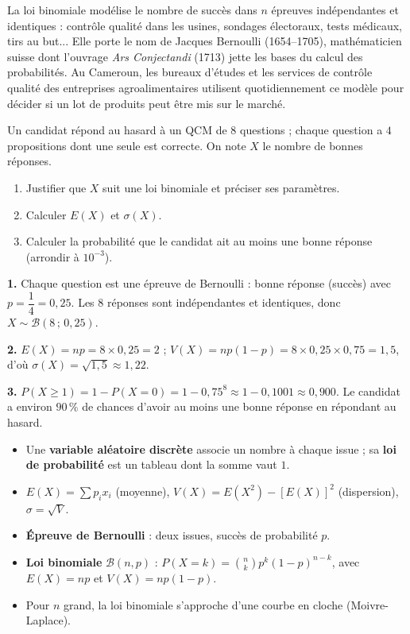 \documentclass[11pt]{article}
\begin{document}
\begin{savaistu}
La loi binomiale modélise le nombre de succès dans $n$ épreuves indépendantes et identiques : contrôle qualité dans les usines, sondages électoraux, tests médicaux, tirs au but... Elle porte le nom de Jacques Bernoulli (1654--1705), mathématicien suisse dont l'ouvrage \emph{Ars Conjectandi} (1713) jette les bases du calcul des probabilités. Au Cameroun, les bureaux d'études et les services de contrôle qualité des entreprises agroalimentaires utilisent quotidiennement ce modèle pour décider si un lot de produits peut être mis sur le marché.
\end{savaistu}

\begin{exercice}
Un candidat répond au hasard à un QCM de $8$ questions ; chaque question a $4$ propositions dont une seule est correcte. On note $X$ le nombre de bonnes réponses.
\begin{enumerate}
\item Justifier que $X$ suit une loi binomiale et préciser ses paramètres.
\item Calculer $E(X)$ et $\sigma(X)$.
\item Calculer la probabilité que le candidat ait au moins une bonne réponse (arrondir à $10^{-3}$).
\end{enumerate}
\end{exercice}

\begin{corrige}[Exercice 3.5]
\textbf{1.} Chaque question est une épreuve de Bernoulli : bonne réponse (succès) avec $p = \dfrac{1}{4} = 0{,}25$. Les $8$ réponses sont indépendantes et identiques, donc $X \sim \mathcal{B}(8\,;\,0{,}25)$.

\textbf{2.} $E(X) = np = 8 \times 0{,}25 = 2$ ; $V(X) = np(1-p) = 8 \times 0{,}25 \times 0{,}75 = 1{,}5$, d'où $\sigma(X) = \sqrt{1{,}5} \approx 1{,}22$.

\textbf{3.} $P(X \geq 1) = 1 - P(X = 0) = 1 - 0{,}75^8 \approx 1 - 0{,}1001 \approx 0{,}900$. Le candidat a environ $90\,\%$ de chances d'avoir au moins une bonne réponse en répondant au hasard.
\end{corrige}

\begin{aretenir}
\begin{itemize}
\item Une \textbf{variable aléatoire discrète} associe un nombre à chaque issue ; sa \textbf{loi de probabilité} est un tableau dont la somme vaut $1$.
\item $E(X) = \sum p_i x_i$ (moyenne), $V(X) = E(X^2) - [E(X)]^2$ (dispersion), $\sigma = \sqrt{V}$.
\item \textbf{Épreuve de Bernoulli} : deux issues, succès de probabilité $p$.
\item \textbf{Loi binomiale} $\mathcal{B}(n,p)$ : $P(X=k) = \binom{n}{k} p^k (1-p)^{n-k}$, avec $E(X) = np$ et $V(X) = np(1-p)$.
\item Pour $n$ grand, la loi binomiale s'approche d'une courbe en cloche (Moivre-Laplace).
\end{itemize}
\end{aretenir}
\end{document}
